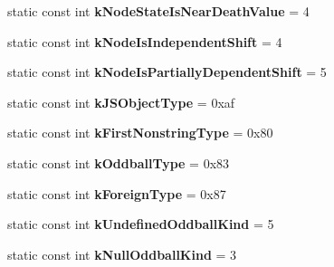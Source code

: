 \begin{DoxyCompactItemize}
\item 
\hypertarget{classv8_1_1internal_1_1_internals_a18f3e757639b07bdabb8cda7dd4a8bdb}{}static const int {\bfseries k\+Node\+State\+Is\+Near\+Death\+Value} = 4\label{classv8_1_1internal_1_1_internals_a18f3e757639b07bdabb8cda7dd4a8bdb}

\item 
\hypertarget{classv8_1_1internal_1_1_internals_a228b2b58c77c17bc512b92d9e3aea48b}{}static const int {\bfseries k\+Node\+Is\+Independent\+Shift} = 4\label{classv8_1_1internal_1_1_internals_a228b2b58c77c17bc512b92d9e3aea48b}

\item 
\hypertarget{classv8_1_1internal_1_1_internals_aeda4d6fc1bd10ca57398597f3bb496f3}{}static const int {\bfseries k\+Node\+Is\+Partially\+Dependent\+Shift} = 5\label{classv8_1_1internal_1_1_internals_aeda4d6fc1bd10ca57398597f3bb496f3}

\item 
\hypertarget{classv8_1_1internal_1_1_internals_a56b7062df5d9a7df491137d4c3341bcc}{}static const int {\bfseries k\+J\+S\+Object\+Type} = 0xaf\label{classv8_1_1internal_1_1_internals_a56b7062df5d9a7df491137d4c3341bcc}

\item 
\hypertarget{classv8_1_1internal_1_1_internals_a6f4a54927b01a11f444fb2f00b47ca1d}{}static const int {\bfseries k\+First\+Nonstring\+Type} = 0x80\label{classv8_1_1internal_1_1_internals_a6f4a54927b01a11f444fb2f00b47ca1d}

\item 
\hypertarget{classv8_1_1internal_1_1_internals_a13081e936f8c96472f1b1496c70d4dc1}{}static const int {\bfseries k\+Oddball\+Type} = 0x83\label{classv8_1_1internal_1_1_internals_a13081e936f8c96472f1b1496c70d4dc1}

\item 
\hypertarget{classv8_1_1internal_1_1_internals_a263195f36f9e8ee64af70dc267a85d55}{}static const int {\bfseries k\+Foreign\+Type} = 0x87\label{classv8_1_1internal_1_1_internals_a263195f36f9e8ee64af70dc267a85d55}

\item 
\hypertarget{classv8_1_1internal_1_1_internals_a39072b9e0ffea4031f4a1c514208b20d}{}static const int {\bfseries k\+Undefined\+Oddball\+Kind} = 5\label{classv8_1_1internal_1_1_internals_a39072b9e0ffea4031f4a1c514208b20d}

\item 
\hypertarget{classv8_1_1internal_1_1_internals_a72243c5512cb5cab9d10b6f29e775180}{}static const int {\bfseries k\+Null\+Oddball\+Kind} = 3\label{classv8_1_1internal_1_1_internals_a72243c5512cb5cab9d10b6f29e775180}

\end{DoxyCompactItemize}



